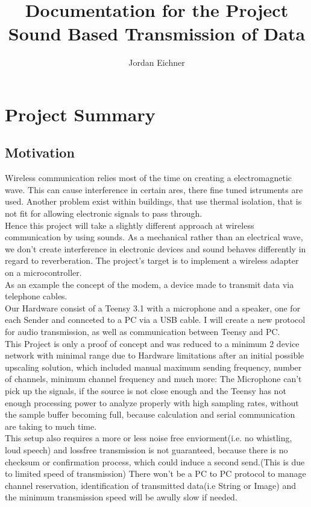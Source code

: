 \documentclass{book}
\title{Documentation for the Project Sound Based Transmission of Data}
\author{Jordan Eichner}
\begin{document}
\maketitle
\tableofcontents
\chapter{Project Summary}
\section{Motivation}
Wireless communication relies most of the time on creating a electromagnetic wave. This can cause interference in certain ares, there fine tuned istruments are used. Another problem exist within buildings, that use thermal isolation, that is not fit for allowing electronic signals to pass through.
\\ Hence this project will take a slightly different approach at wireless communication by using sounds. As a mechanical rather than an electrical wave, we don't create interference in electronic devices and sound behaves differently in regard to reverberation. The project's target is to implement a wireless adapter on a microcontroller.
\\As an example the concept of the modem, a device made to transmit data via telephone cables.
\\Our Hardware consist of a Teensy 3.1 with a microphone and a speaker, one for each Sender and connceted to a PC via a USB cable.
I will create a new protocol for audio transmission, as well as communication between Teensy and PC. 
\\This Project is only a proof of concept and was reduced to a minimum 2 device network with minimal range due to Hardware limitations after an initial possible upscaling solution, which included manual maximum sending frequency, number of channels, minimum channel frequency and much more: The Microphone can't pick up the signals, if the source is not close enough and the Teensy has not enough processing power to analyze properly with high sampling rates, without the sample buffer becoming full, because calculation and serial communication are taking to much time.
\\This setup also requires a more or less noise free enviorment(i.e. no whistling, loud speech) and lossfree transmission is not guaranteed, because there is no checksum or confirmation process, which could induce a second send.(This is due to limited speed of transmission) There won't be a PC to PC protocol to manage channel reservation, identification of transmitted data(i.e String or Image) and the minimum transmission speed will be awully slow if needed.
\end{document}
